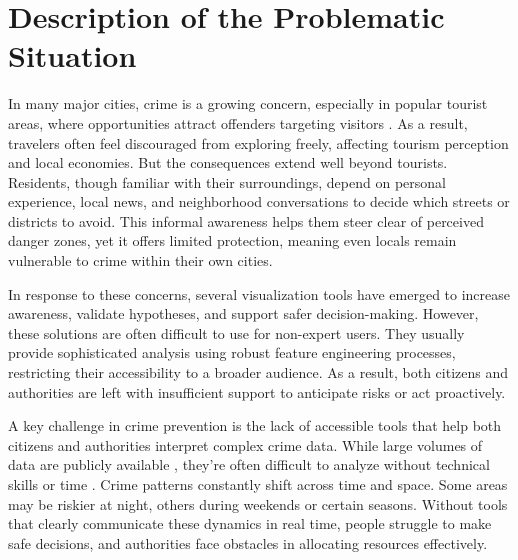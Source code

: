 \section{Description of the Problematic Situation}

In many major cities, crime is a growing concern, especially in popular tourist areas, where opportunities attract offenders targeting visitors \citep{SopikoTevdoradze2024CrimeTourism,Machado2012CrimeRJ}. As a result, travelers often feel discouraged from exploring freely, affecting tourism perception and local economies. But the consequences extend well beyond tourists. Residents, though familiar with their surroundings, depend on personal experience, local news, and neighborhood conversations to decide which streets or districts to avoid. This informal awareness helps them steer clear of perceived danger zones, yet it offers limited protection, meaning even locals remain vulnerable to crime within their own cities. 


In response to these concerns, several visualization tools \citep{Garcia2022CriPAV, Salah2022BigCDVis, Silva2017CrimeVisAI, Garcia2020MiranteAV, Garcia2021CrimAnalyzer} have emerged to increase awareness, validate hypotheses, and support safer decision-making. However, these solutions are often difficult to use for non-expert users. They usually provide sophisticated analysis using robust feature engineering processes, restricting their accessibility to a broader audience. As a result, both citizens and authorities are left with insufficient support to anticipate risks or act proactively.

A key challenge in crime prevention is the lack of accessible tools that help both citizens and authorities interpret complex crime data. While large volumes of data are publicly available \citep{Zhang2025CrimeDatasetChina, NYCDataset, ChicagoDataset}, they're often difficult to analyze without technical skills or time \citep{Zengli2020CrimePatterns}. Crime patterns constantly shift across time and space. Some areas may be riskier at night, others during weekends or certain seasons. Without tools that clearly communicate these dynamics in real time, people struggle to make safe decisions, and authorities face obstacles in allocating resources effectively.

